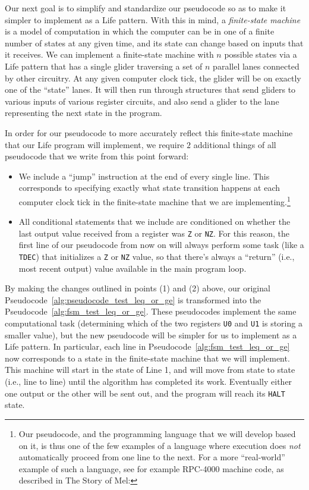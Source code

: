 Our next goal is to simplify and standardize our pseudocode so as to make it simpler to implement as a Life pattern. With this in mind, a \emph{finite-state machine} is a model of computation in which the computer can be in one of a finite number of states at any given time, and its state can change based on inputs that it receives. We can implement a finite-state machine with $n$ possible states via a Life pattern that has a single glider traversing a set of $n$ parallel lanes connected by other circuitry.  At any given computer clock tick, the glider will be on exactly one of the ``state'' lanes. It will then run through structures that send gliders to various inputs of various register circuits, and also send a glider to the lane representing the next state in the program.

In order for our pseudocode to more accurately reflect this finite-state machine that our Life program will implement, we require $2$ additional things of all pseudocode that we write from this point forward:\smallskip

\begin{itemize}
	\item[1)] We include a ``jump'' instruction at the end of every single line. This corresponds to specifying exactly what state transition happens at each computer clock tick in the finite-state machine that we are implementing.\footnote{Our pseudocode, and the programming language that we will develop based on it, is thus one of the few examples of a language where execution does \emph{not} automatically proceed from one line to the next. For a more ``real-world'' example of such a language, see for example RPC-4000 machine code, as described in The Story of Mel: }\smallskip
	
	\item[2)] All conditional statements that we include are conditioned on whether the last output value received from a register was \texttt{Z} or \texttt{NZ}. For this reason, the first line of our pseudocode from now on will always perform some task (like a \texttt{TDEC}) that initializes a \texttt{Z} or \texttt{NZ} value, so that there's always a ``return'' (i.e., most recent output) value available in the main program loop.\smallskip
\end{itemize}

By making the changes outlined in points (1) and (2) above, our original Pseudocode~\ref{alg:pseudocode_test_leq_or_ge} is transformed into the Pseudocode~\ref{alg:fsm_test_leq_or_ge}. These pseudocodes implement the same computational task (determining which of the two registers \texttt{U0} and \texttt{U1} is storing a smaller value), but the new pseudocode will be simpler for us to implement as a Life pattern. In particular, each line in Pseudocode~\ref{alg:fsm_test_leq_or_ge} now corresponds to a state in the finite-state machine that we will implement. This machine will start in the state of Line 1, and will move from state to state (i.e., line to line) until the algorithm has completed its work. Eventually either one output or the other will be sent out, and the program will reach its \texttt{HALT} state.

